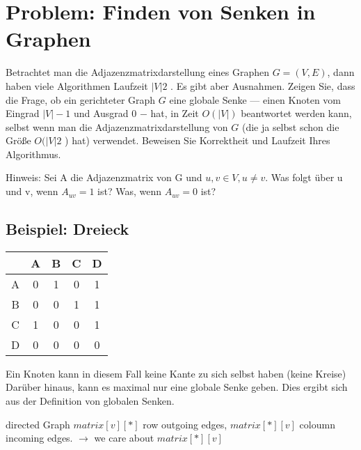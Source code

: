 \section{Problem: Finden von Senken in Graphen}

Betrachtet man die Adjazenzmatrixdarstellung eines Graphen $G = (V, E)$, dann
haben viele Algorithmen Laufzeit $|V|2$ . Es gibt aber Ausnahmen. Zeigen Sie, dass
die Frage, ob ein gerichteter Graph $G$ eine globale Senke — einen Knoten vom
Eingrad $|V | - 1$ und Ausgrad 0 $-$ hat, in Zeit $O(|V|)$ beantwortet werden kann,
selbst wenn man die Adjazenzmatrixdarstellung von $G$ (die ja selbst schon die Größe
$O(|V|2$ ) hat) verwendet. Beweisen Sie Korrektheit und Laufzeit Ihres Algorithmus.

Hinweis: Sei A die Adjazenzmatrix von G und $u, v \in V , u \neq v$. Was folgt über u
und v, wenn $A_{uv} = 1$ ist? Was, wenn $A_{uv} = 0$ ist?

\subsection{Beispiel: Dreieck}

\begin{center}
\begin{tabular}{|c|c|c|c|c|}
	\hline
	& A & B & C & D \\
	\hline
	A & 0 & 1 & 0 & 1 \\
	\hline
	B & 0 & 0 & 1 & 1 \\
	\hline
	C & 1 & 0 & 0 & 1 \\
	\hline
	D & 0 & 0 & 0 & 0 \\
	\hline
\end{tabular}
\end{center}

\noindent
Ein Knoten kann in diesem Fall keine Kante zu sich selbst haben (keine Kreise)\\
Darüber hinaus, kann es maximal nur eine globale Senke geben. Dies ergibt sich aus der Definition von globalen Senken.

directed Graph $matrix[v][*]$ row outgoing edges, $matrix[*][v]$ coloumn incoming edges. $\rightarrow$ we care about $matrix[*][v]$

